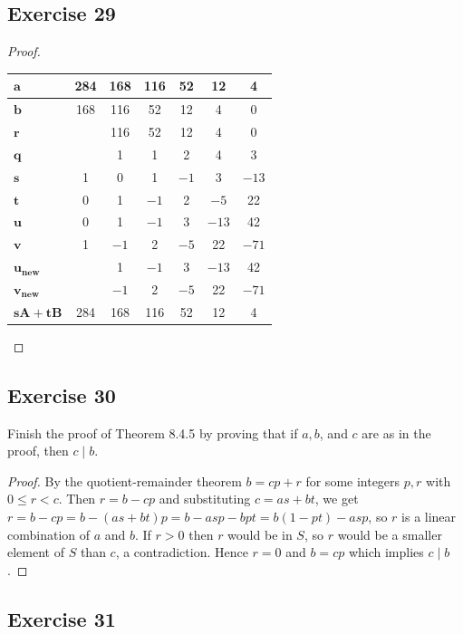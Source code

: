 \documentclass[14pt]{extarticle}
\begin{document}
\subsection{Exercise 29}
\begin{proof}
\begin{center}
\begin{tabular}{|l|c|c|c|c|c|c|}
\hline
\(\bm{a}\) & 284 & 168 & 116 & 52 & 12 & 4 \\
\hline
\(\bm{b}\) & 168 & 116 & 52 & 12 & 4 & 0 \\
\hline
\(\bm{r}\) & & 116 & 52 & 12 & 4 & 0 \\
\hline
\(\bm{q}\) & & 1 & 1 & 2 & 4 & 3 \\
\hline
\(\bm{s}\) & 1 & 0 & 1 & $-1$ & 3 & $-13$ \\
\hline
\(\bm{t}\) & 0 & 1 & $-1$ & 2 & $-5$ & 22 \\
\hline
\(\bm{u}\) & 0 & 1 & $-1$ & 3 & $-13$ & 42 \\
\hline
\(\bm{v}\) & 1 & $-1$ & 2 & $-5$ & 22 & $-71$ \\
\hline
\(\bm{u_{new}}\) & & 1 & $-1$ & 3 & $-13$ & 42 \\
\hline
\(\bm{v_{new}}\) & & $-1$ & 2 & $-5$ & 22 & $-71$ \\
\hline
\(\bm{sA+tB}\) & 284 & 168 & 116 & 52 & 12 & 4 \\
\hline
\end{tabular}
\end{center}
\end{proof}

\subsection{Exercise 30}
Finish the proof of Theorem 8.4.5 by proving that if \(a, b\), and $c$ are as in the proof, then \(c \mid b\).

\begin{proof}
By the quotient-remainder theorem \(b = cp + r\) for some integers \(p,r\) with \(0 \leq r < c\). Then \(r = b - cp\)
and substituting \(c = as+bt\), we get \(r = b - cp = b-(as+bt)p = b - asp - bpt = b(1-pt) - asp\), so $r$ is a 
linear combination of $a$ and $b$. If \(r > 0\) then $r$ would be in $S$, so $r$ would be a smaller element of $S$
than $c$, a contradiction. Hence $r = 0$ and \(b = cp\) which implies \(c \mid b\).
\end{proof}

\subsection{Exercise 31}
\end{document}
